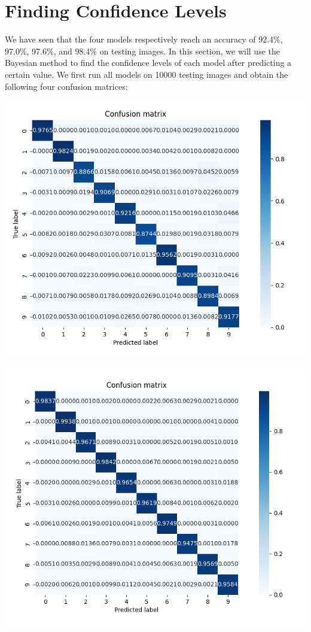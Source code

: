 \documentclass[11pt]{amsart}
\begin{document}
\section{Finding Confidence Levels}

We have seen that the four models respectively reach an accuracy of 92.4\%, 97.0\%, 97.6\%, and 98.4\% on testing images. In this section, we will use the Bayesian method to find the confidence levels of each model after predicting a certain value. 
We first run all models on 10000 testing images and obtain the following four confusion matrices:

\hspace{-0.3in}
\begin{minipage}{0.5\linewidth}
\includegraphics[width = \linewidth]{Confusion_matrix1.png}
\end{minipage}
\begin{minipage}{0.5\linewidth}
\includegraphics[width = \linewidth]{Confusion_matrix2.png}
\end{minipage}
\end{document}
